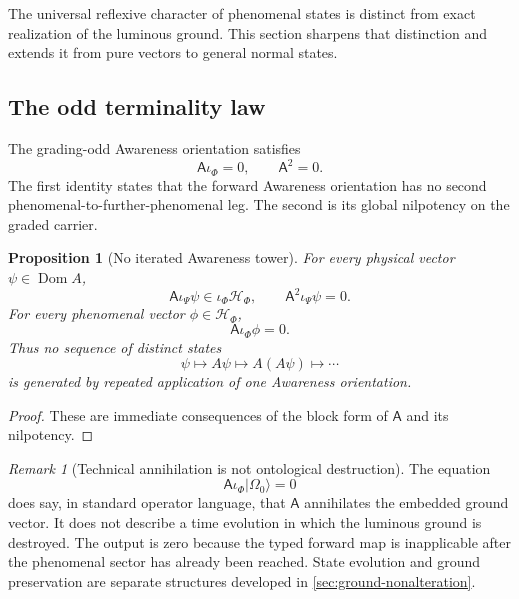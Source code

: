 \documentclass[11pt,reqno]{scrartcl}
\newcommand{\scrHF}{\mathscr H_{\Phi}}
\newcommand{\Aodd}{\mathsf A}
\newcommand{\iP}{\iota_{\Psi}}
\newcommand{\iF}{\iota_{\Phi}}
\newcommand{\ket}[1]{\lvert #1\rangle}
\DeclareMathOperator{\Dom}{Dom}
\theoremstyle{plain}
\newtheorem{proposition}[proposition]{Proposition}
\theoremstyle{definition}
\theoremstyle{remark}
\newtheorem{remark}[remark]{Remark}
\begin{document}
The universal reflexive character of phenomenal states is distinct from exact
realization of the luminous ground.  This section sharpens that distinction
and extends it from pure vectors to general normal states.

\subsection{The odd terminality law}

The grading-odd Awareness orientation satisfies
\begin{equation}
  \Aodd\iF=0,
  \qquad
  \Aodd^2=0.
  \label{eq:odd-terminal-law}
\end{equation}
The first identity states that the forward Awareness orientation has no second
phenomenal-to-further-phenomenal leg.  The second is its global nilpotency on
the graded carrier.

\begin{proposition}[No iterated Awareness tower]
\label{prop:no-iterated-awareness-tower}
For every physical vector $\psi\in\Dom A$,
\begin{equation}
  \Aodd\iP\psi\in\iF\scrHF,
  \qquad
  \Aodd^2\iP\psi=0.
  \label{eq:no-awareness-tower}
\end{equation}
For every phenomenal vector $\phi\in\scrHF$,
\begin{equation}
  \Aodd\iF\phi=0.
  \label{eq:phenomenal-terminal-all}
\end{equation}
Thus no sequence of distinct states
\begin{equation}
  \psi\longmapsto A\psi\longmapsto A(A\psi)\longmapsto\cdots
\end{equation}
is generated by repeated application of one Awareness orientation.
\end{proposition}

\begin{proof}
These are immediate consequences of the block form of $\Aodd$ and its
nilpotency.
\end{proof}

\begin{remark}[Technical annihilation is not ontological destruction]
\label{rem:annihilation-not-destruction}
The equation
\begin{equation}
  \Aodd\iF\ket{\Omega_0}=0
  \label{eq:A-annihilates-ground-technically}
\end{equation}
does say, in standard operator language, that $\Aodd$ annihilates the embedded
ground vector.  It does not describe a time evolution in which the luminous
ground is destroyed.  The output is zero because the typed forward map is
inapplicable after the phenomenal sector has already been reached.  State
evolution and ground preservation are separate structures developed in
\cref{sec:ground-nonalteration}.
\end{remark}
\end{document}
